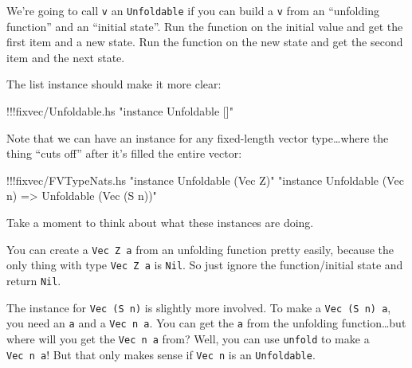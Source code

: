 \documentclass[]{article}
\newenvironment{Shaded}{}{}
\newcommand{\DataTypeTok}[1]{\textcolor[rgb]{0.56,0.13,0.00}{{#1}}}
\newcommand{\DecValTok}[1]{\textcolor[rgb]{0.25,0.63,0.44}{{#1}}}
\newcommand{\StringTok}[1]{\textcolor[rgb]{0.25,0.44,0.63}{{#1}}}
\newcommand{\OtherTok}[1]{\textcolor[rgb]{0.00,0.44,0.13}{{#1}}}
\newcommand{\FunctionTok}[1]{\textcolor[rgb]{0.02,0.16,0.49}{{#1}}}
\newcommand{\NormalTok}[1]{{#1}}
\begin{document}
We're going to call \texttt{v} an \texttt{Unfoldable} if you can build a
\texttt{v} from an ``unfolding function'' and an ``initial state''. Run
the function on the initial value and get the first item and a new
state. Run the function on the new state and get the second item and the
next state.

The list instance should make it more clear:

\begin{Shaded}
\begin{Highlighting}[]
\FunctionTok{!!!}\NormalTok{fixvec}\FunctionTok{/}\NormalTok{Unfoldable.hs }\StringTok{"instance Unfoldable []"}
\end{Highlighting}
\end{Shaded}

\begin{Shaded}
\end{Shaded}

Note that we can have an instance for any fixed-length vector
type\ldots{}where the thing ``cuts off'' after it's filled the entire
vector:

\begin{Shaded}
\begin{Highlighting}[]
\FunctionTok{!!!}\NormalTok{fixvec}\FunctionTok{/}\NormalTok{FVTypeNats.hs }\StringTok{"instance Unfoldable (Vec Z)"} \StringTok{"instance Unfoldable (Vec n) => Unfoldable (Vec (S n))"}
\end{Highlighting}
\end{Shaded}

Take a moment to think about what these instances are doing.

You can create a \texttt{Vec\ Z\ a} from an unfolding function pretty
easily, because the only thing with type \texttt{Vec\ Z\ a} is
\texttt{Nil}. So just ignore the function/initial state and return
\texttt{Nil}.

The instance for \texttt{Vec\ (S\ n)} is slightly more involved. To make
a \texttt{Vec\ (S\ n)\ a}, you need an \texttt{a} and a
\texttt{Vec\ n\ a}. You can get the \texttt{a} from the unfolding
function\ldots{}but where will you get the \texttt{Vec\ n\ a} from?
Well, you can use \texttt{unfold} to make a \texttt{Vec\ n\ a}! But that
only makes sense if \texttt{Vec\ n} is an \texttt{Unfoldable}.
\end{document}

